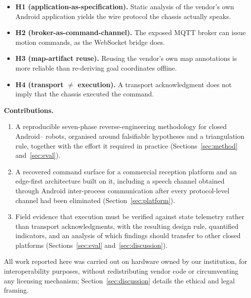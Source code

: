 \begin{itemize}[leftmargin=1.2em]
\item \textbf{H1 (application-as-specification).} Static analysis of the vendor's own Android
application yields the wire protocol the chassis actually speaks.
\item \textbf{H2 (broker-as-command-channel).} The exposed MQTT broker can issue motion
commands, as the WebSocket bridge does.
\item \textbf{H3 (map-artifact reuse).} Reusing the vendor's own map annotations is more
reliable than re-deriving goal coordinates offline.
\item \textbf{H4 (transport $\neq$ execution).} A transport acknowledgment does not imply that
the chassis executed the command.
\end{itemize}

\textbf{Contributions.}
\begin{enumerate}[label=\textbf{C\arabic*.},leftmargin=1.5em]
\item A reproducible seven-phase reverse-engineering methodology for closed Android--\ros{}
robots, organised around falsifiable hypotheses and a triangulation rule, together with the
effort it required in practice (Sections~\ref{sec:method} and~\ref{sec:eval}).
\item A recovered command surface for a commercial reception platform and an edge-first
architecture built on it, including a speech channel obtained through Android inter-process
communication after every protocol-level channel had been eliminated
(Section~\ref{sec:platform}).
\item Field evidence that execution must be verified against state telemetry rather than
transport acknowledgments, with the resulting design rule, quantified indicators, and an
analysis of which findings should transfer to other closed platforms
(Sections~\ref{sec:eval} and~\ref{sec:discussion}).
\end{enumerate}

All work reported here was carried out on hardware owned by our institution, for
interoperability purposes, without redistributing vendor code or circumventing any licensing
mechanism; Section~\ref{sec:discussion} details the ethical and legal framing.
